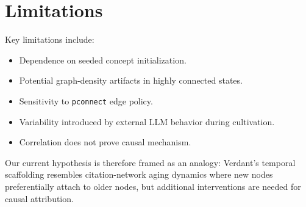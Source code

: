 \section{Limitations}
Key limitations include:
\begin{itemize}[leftmargin=*]
  \item Dependence on seeded concept initialization.
  \item Potential graph-density artifacts in highly connected states.
  \item Sensitivity to \texttt{pconnect} edge policy.
  \item Variability introduced by external LLM behavior during cultivation.
  \item Correlation does not prove causal mechanism.
\end{itemize}

Our current hypothesis is therefore framed as an analogy: Verdant's temporal scaffolding resembles citation-network aging dynamics where new nodes preferentially attach to older nodes, but additional interventions are needed for causal attribution.
